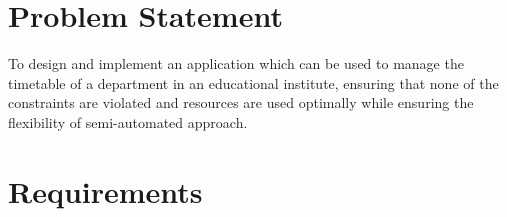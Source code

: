 			
\section{Problem Statement}

To design and implement an application which can be used to manage the timetable of a department in an educational institute, ensuring that none of the constraints are violated and resources are used optimally while ensuring the flexibility of semi-automated approach.


\section{Requirements}
